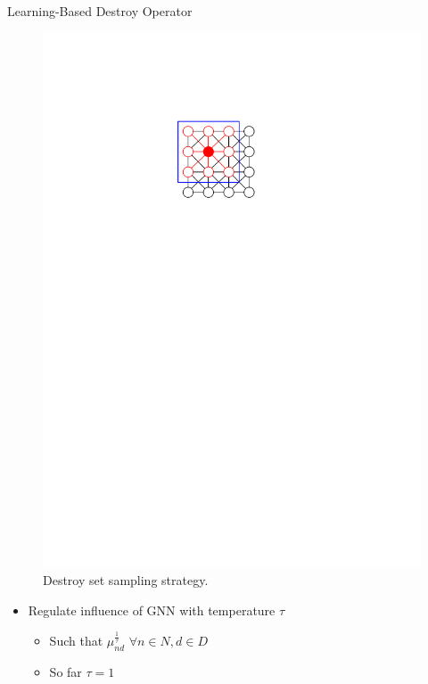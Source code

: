 \documentclass[aspectratio=1610]{beamer}
\newcommand{\important}[1]{{\color{green!60!black}#1}}
\begin{document}
\begin{frame}{Learning-Based Destroy Operator}
\begin{figure}
\begin{overprint}
			\centering\includegraphics[width=\textwidth, page=24]{figures/graphics.pdf}
		\end{overprint}
		\caption{Destroy set sampling strategy.}
	\end{figure}
	\begin{itemize}
		\item Regulate \important{influence} of GNN with \important{temperature} $\tau$
		\begin{itemize}
			\item Such that $\mu_{nd}^\frac{1}{\tau}$ $\forall n \in N, d \in D$
			\item So far $\tau=1$
		\end{itemize}
	\end{itemize}
\end{frame}
\end{document}
